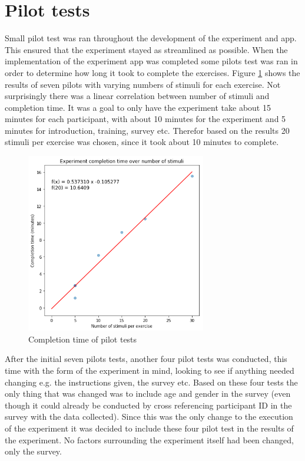 \section{Pilot tests}
Small pilot test was ran throughout the development of the experiment and app. This ensured that the experiment stayed as streamlined as possible. When the implementation of the experiment app was completed some pilots test was ran in order to determine how long it took to complete the exercises. Figure \ref{pilot} shows the results of seven pilots with varying numbers of stimuli for each exercise. Not surprisingly there was a linear correlation between number of stimuli and completion time. It was a goal to only have the experiment take about 15 minutes for each participant, with about 10 minutes for the experiment and 5 minutes for introduction, training, survey etc. Therefor based on the results 20 stimuli per exercise was chosen, since it took about 10 minutes to complete.

\begin{figure}[h!]
    \centering
    \includegraphics[width=0.7\textwidth]{figures/comp_time.png}
    \caption{Completion time of pilot tests}
    \label{pilot}
\end{figure}

After the initial seven pilots tests, another four pilot tests was conducted, this time with the form of the experiment in mind, looking to see if anything needed changing e.g. the instructions given, the survey etc. Based on these four tests the only thing that was changed was to include age and gender in the survey (even though it could already be conducted by cross referencing participant ID in the survey with the data collected). Since this was the only change to the execution of the experiment it was decided to include these four pilot test in the results of the experiment. No factors surrounding the experiment itself had been changed, only the survey.